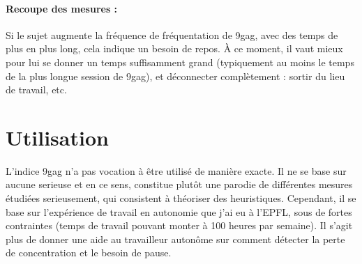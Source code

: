 \documentclass{article}
\begin{document}
\paragraph{Recoupe des mesures : }
Si le sujet augmente la fréquence de fréquentation de 9gag, avec des temps de plus en plus long, cela indique un besoin de repos. À ce moment, il vaut mieux pour lui se donner un temps suffisamment grand (typiquement au moins le temps de la plus longue session de 9gag), et déconnecter complètement : sortir du lieu de travail, etc.
\section{Utilisation}
L'indice 9gag n'a pas vocation à être utilisé de manière exacte. Il ne se base sur aucune serieuse et en ce sens, constitue plutôt une parodie de différentes mesures étudiées serieusement, qui consistent à théoriser des heuristiques. 
Cependant, il se base sur l'expérience de travail en autonomie que j'ai eu à l'EPFL, sous de fortes contraintes (temps de travail pouvant monter à 100 heures par semaine). Il s'agit plus de donner une aide au travailleur autonôme sur comment détecter la perte de concentration et le besoin de pause.
\end{document}
